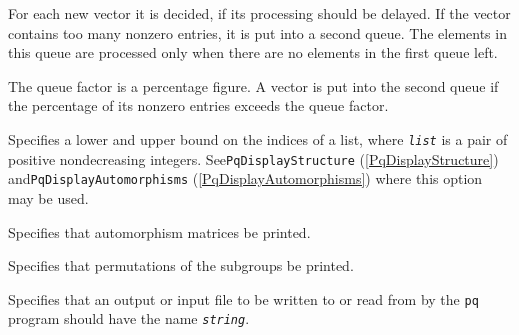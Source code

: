 \documentclass[a4paper,11pt]{report}
\begin{document}
{{\begin{description}
 For each new vector it is decided, if its processing should be delayed. If the
vector contains too many non\texttt{}zero entries, it is put into a
second queue. The elements in this queue are processed only when there are no
elements in the first queue left. 

 The queue factor is a percentage figure. A vector is put into the second queue
if the percentage of its non\texttt{}zero entries exceeds the queue
factor. 
\item[{\texttt{Bounds := \mbox{\texttt{\mdseries\slshape list}}} \label{option Bounds}\index{option Bounds}}]  Specifies a lower and upper bound on the indices of a list, where \mbox{\texttt{\mdseries\slshape list}} is a pair of positive non\texttt{}decreasing integers.
See{\nobreakspace}\texttt{PqDisplayStructure} (\ref{PqDisplayStructure}) and{\nobreakspace}\texttt{PqDisplayAutomorphisms} (\ref{PqDisplayAutomorphisms}) where this option may be used. 
\item[{\texttt{PrintAutomorphisms := \mbox{\texttt{\mdseries\slshape list}}} \label{option PrintAutomorphisms}\index{option PrintAutomorphisms}}]  Specifies that automorphism matrices be printed. 
\item[{\texttt{PrintPermutations := \mbox{\texttt{\mdseries\slshape list}}} \label{option PrintPermutations}\index{option PrintPermutations}}]  Specifies that permutations of the subgroups be printed. 
\item[{\texttt{Filename := \mbox{\texttt{\mdseries\slshape string}}} \label{option Filename}\index{option Filename}}]  Specifies that an output or input file to be written to or read from by the \texttt{pq} program should have the name \mbox{\texttt{\mdseries\slshape string}}. 
\end{description}
 }

 }

 
\end{document}
